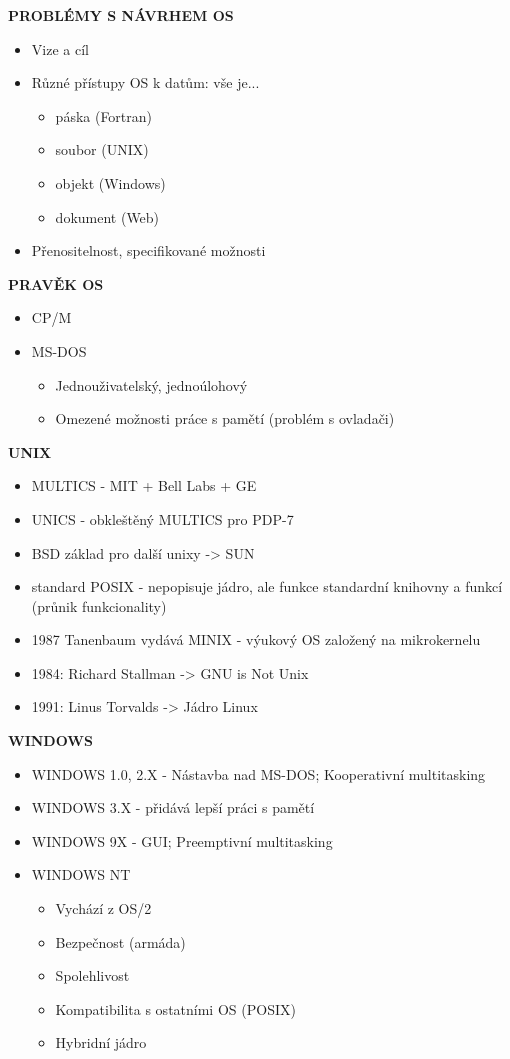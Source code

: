 \documentclass[10pt,a4paper]{article}
\begin{document}
\textbf{PROBLÉMY S NÁVRHEM OS}
\begin{itemize}
	\item Vize a cíl
	\item Různé přístupy OS k datům: vše je...
	\begin{itemize}
		\item páska (Fortran)
		\item soubor (UNIX)
		\item objekt (Windows)
		\item dokument (Web)
	\end{itemize}
	\item Přenositelnost, specifikované možnosti
\end{itemize}

\textbf{PRAVĚK OS}
\begin{itemize}
	\item CP/M
	\item MS-DOS
	\begin{itemize}
		\item Jednouživatelský, jednoúlohový
		\item Omezené možnosti práce s pamětí (problém s ovladači)
	\end{itemize}
\end{itemize}

\textbf{UNIX}
\begin{itemize}
	\item MULTICS - MIT + Bell Labs + GE
	\item UNICS - obkleštěný MULTICS pro PDP-7
	\item BSD základ pro další unixy -> SUN
	\item standard POSIX - nepopisuje jádro, ale funkce standardní knihovny a funkcí (průnik funkcionality)
	\item 1987 Tanenbaum vydává MINIX - výukový OS založený na mikrokernelu
	\item 1984: Richard Stallman -> GNU is Not Unix
	\item 1991: Linus Torvalds -> Jádro Linux
\end{itemize}

\textbf{WINDOWS}
\begin{itemize}
	\item WINDOWS 1.0, 2.X - Nástavba nad MS-DOS; Kooperativní multitasking
	\item WINDOWS 3.X - přidává lepší práci s pamětí
	\item WINDOWS 9X - GUI; Preemptivní multitasking
	\item WINDOWS NT
	\begin{itemize}
		\item Vychází z OS/2
		\item Bezpečnost (armáda)
		\item Spolehlivost
		\item Kompatibilita s ostatními OS (POSIX)
		\item Hybridní jádro
	\end{itemize}
\end{itemize}
\end{document}
